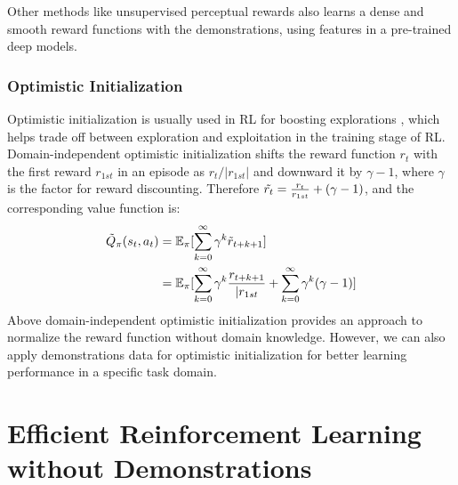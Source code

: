 \documentclass{article}
\begin{document}
Other methods like unsupervised perceptual rewards \cite{sermanet2016unsupervised} also learns a dense and smooth reward functions with the demonstrations, using features in a pre-trained deep models.

\subsubsection{Optimistic Initialization}
Optimistic initialization is usually used in RL for boosting explorations \cite{sutton2018reinforcement}, which helps trade off between exploration and exploitation in the training stage of RL. Domain-independent optimistic initialization \cite{machado2015domain} shifts the reward function $r_t$ with the first reward $r_{1st}$ in an episode as $r_t/|r_{1st}|$ and downward it by $\gamma-1$, where $\gamma$ is the factor for reward discounting. Therefore $\Tilde{r_t}=\frac{r_t}{r_{1st}}+(\gamma-1)$, and the corresponding value function is:
\begin{equation}
\begin{aligned}
    \Tilde{Q}_\pi(s_t,a_t)&=\mathbb{E}_\pi[\sum_{k=0}^\infty\gamma^k\Tilde{r}_{t+k+1}]\\
    &=\mathbb{E}_\pi[\sum_{k=0}^\infty\gamma^k\frac{r_{t+k+1}}{|r_{1st}}+\sum_{k=0}^\infty\gamma^k(\gamma-1)]
\end{aligned}
\end{equation}
Above domain-independent optimistic initialization provides an approach to normalize the reward function without domain knowledge. However, we can also apply demonstrations data for optimistic initialization for better learning performance in a specific task domain. 


\section{Efficient Reinforcement Learning without Demonstrations}
\end{document}

